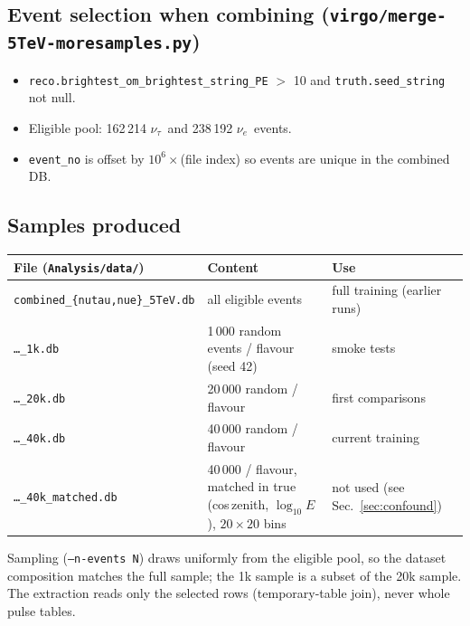 \documentclass[11pt,a4paper]{article}
\newcommand{\nutau}{\ensuremath{\nu_\tau}}
\newcommand{\nue}{\ensuremath{\nu_e}}
\newcommand{\code}[1]{\texttt{#1}}
\begin{document}
\subsection{Event selection when combining (\code{virgo/merge-5TeV-moresamples.py})}
\begin{itemize}
  \item \code{reco.brightest\_om\_brightest\_string\_PE} $>$ 10 and \code{truth.seed\_string} not null.
  \item Eligible pool: 162\,214 \nutau\ and 238\,192 \nue\ events.
  \item \code{event\_no} is offset by $10^6\times$(file index) so events are unique in the combined DB.
\end{itemize}

\subsection{Samples produced}
\begin{tabularx}{\textwidth}{lYl}
\toprule
File (\code{Analysis/data/}) & Content & Use\\
\midrule
\code{combined\_\{nutau,nue\}\_5TeV.db} & all eligible events & full training (earlier runs)\\
\code{\dots\_1k.db} & 1\,000 random events / flavour (seed 42) & smoke tests\\
\code{\dots\_20k.db} & 20\,000 random / flavour & first comparisons\\
\code{\dots\_40k.db} & 40\,000 random / flavour & current training\\
\code{\dots\_40k\_matched.db} & 40\,000 / flavour, matched in true (cos\,zenith, $\log_{10}E$), $20\times20$ bins & not used (see Sec.~\ref{sec:confound})\\
\bottomrule
\end{tabularx}

\medskip
Sampling (\code{--n-events N}) draws uniformly from the eligible pool, so the dataset composition matches the full
sample; the 1k sample is a subset of the 20k sample. The extraction reads only the selected rows (temporary-table
join), never whole pulse tables.
\end{document}
